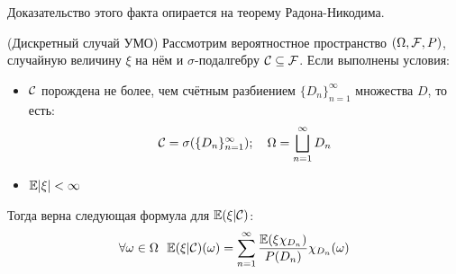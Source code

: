 \begin{note}
    Доказательство этого факта опирается на теорему Радона-Никодима.
\end{note}

\begin{lemma} (Дискретный случай УМО)
	Рассмотрим вероятностное пространство $(\Omega, \mathcal{F}, P)$, случайную величину $\xi$ на нём и $\sigma$-подалгебру $\mathcal{C} \subseteq \mathcal{F}$. Если выполнены условия:
	\begin{itemize}
		\item $\mathcal{C}$ порождена не более, чем счётным разбиением $\{D_n\}_{n = 1}^\infty$ множества $D$, то есть:
		\[
			\mathcal{C} = \sigma(\{D_n\}_{n = 1}^\infty);\quad \Omega = \bigsqcup_{n = 1}^\infty D_n
		\]
		
		\item $\mathbb{E} |\xi| < \infty$
	\end{itemize}
	Тогда верна следующая формула для $\mathbb{E}(\xi|\mathcal{C})$:
	\[
		\forall \omega \in \Omega\ \ \mathbb{E}(\xi|\mathcal{C})(\omega) = \sum_{n = 1}^\infty \frac{\mathbb{E}(\xi\chi_{D_n})}{P(D_n)} \chi_{D_n}(\omega)
	\]
\end{lemma}

